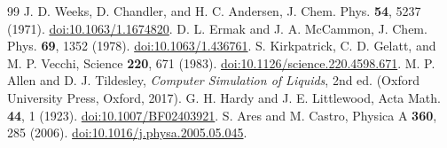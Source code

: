 \documentclass[11pt]{article}
\begin{document}
\begin{thebibliography}{99}
 J. D. Weeks, D. Chandler, and H. C. Andersen, J. Chem. Phys. \textbf{54}, 5237 (1971). \href{https://doi.org/10.1063/1.1674820}{doi:10.1063/1.1674820}.
 D. L. Ermak and J. A. McCammon, J. Chem. Phys. \textbf{69}, 1352 (1978). \href{https://doi.org/10.1063/1.436761}{doi:10.1063/1.436761}.
 S. Kirkpatrick, C. D. Gelatt, and M. P. Vecchi, Science \textbf{220}, 671 (1983). \href{https://doi.org/10.1126/science.220.4598.671}{doi:10.1126/science.220.4598.671}.
 M. P. Allen and D. J. Tildesley, \emph{Computer Simulation of Liquids}, 2nd ed. (Oxford University Press, Oxford, 2017).
 G. H. Hardy and J. E. Littlewood, Acta Math. \textbf{44}, 1 (1923). \href{https://doi.org/10.1007/BF02403921}{doi:10.1007/BF02403921}.
 S. Ares and M. Castro, Physica A \textbf{360}, 285 (2006). \href{https://doi.org/10.1016/j.physa.2005.05.045}{doi:10.1016/j.physa.2005.05.045}.
\end{thebibliography}
\end{document}
